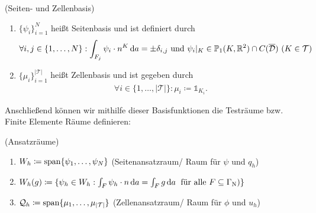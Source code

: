  \begin{Definition}(Seiten- und Zellenbasis) 
	\begin{enumerate}[label=(\alph*)]
		\item $ \{ \psi_i \}_{i=1}^{N} $ heißt Seitenbasis und ist definiert durch
			\begin{align*}
					\forall i,j \in \{1, \dots , N \} : \int_{F_j} \psi_i \cdot n^K \, \mathrm{d} a = \pm \delta_{i,j} \text{ und }  \psi_i|_K \in \mathbb{P}_1(K,\mathbb{R}^2) \cap C(\overline{\mathcal{D}}) \ (K \in \mathcal{T}) 
			\end{align*} 
		\item $ \{ \mu_i \}_{i=1}^{|\mathcal{T}|} $ heißt Zellenbasis und ist gegeben durch
			\begin{align*}
				\forall i \in \{1, \dots , |\mathcal{T}| \} : \mu_i \coloneqq  \mathds{1}_{K_i}.
			\end{align*}
	\end{enumerate}
\end{Definition} 

Anschließend können wir mithilfe dieser Basisfunktionen die Testräume bzw. Finite Elemente Räume definieren:
\begin{Definition}(Ansatzräume)
	\begin{enumerate}[label=(\alph*)]
		\item $ W_h \coloneqq \operatorname{span} \{ \psi_1,\dots,\psi_{N}\}$ (Seitenansatzraum/ Raum für $ \psi $ und $ q_h $)
		\item $ W_h(g) \coloneqq \{ \psi_h \in W_h:  \int_F \psi_h \cdot n \, \mathrm{d} a = \int_F g \, \mathrm{d} a \; \text{ für alle } F \subseteq \Gamma_{\text{N}})  \}$
		\item $ \mathcal{Q}_h \coloneqq \operatorname{span} \{ \mu_1, \dots, \mu_{|\mathcal{T}|} \} $ (Zellenansatzraum/ Raum für $\phi $ und $ u_h $)
	\end{enumerate}
\end{Definition}

%	

